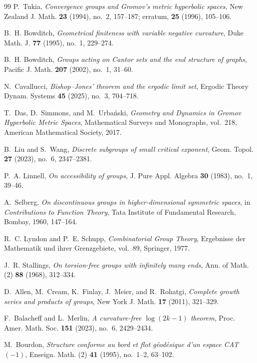 \documentclass[11pt]{article}
\theoremstyle{definition}
\begin{document}
\begin{thebibliography}{99}
P.~Tukia,
\emph{Convergence groups and Gromov's metric hyperbolic spaces},
New Zealand J. Math. \textbf{23} (1994), no.~2, 157--187;
erratum, \textbf{25} (1996), 105--106.

B.~H. Bowditch,
\emph{Geometrical finiteness with variable negative curvature},
Duke Math. J. \textbf{77} (1995), no.~1, 229--274.

B.~H. Bowditch,
\emph{Groups acting on Cantor sets and the end structure of graphs},
Pacific J. Math. \textbf{207} (2002), no.~1, 31--60.

N.~Cavallucci,
\emph{Bishop--Jones' theorem and the ergodic limit set},
Ergodic Theory Dynam. Systems \textbf{45} (2025), no.~3, 704--718.

T.~Das, D.~Simmons, and M.~Urba\'nski,
\emph{Geometry and Dynamics in Gromov Hyperbolic Metric Spaces},
Mathematical Surveys and Monographs, vol.~218, American Mathematical Society, 2017.

B.~Liu and S.~Wang,
\emph{Discrete subgroups of small critical exponent},
Geom. Topol. \textbf{27} (2023), no.~6, 2347--2381.


P.~A. Linnell,
\emph{On accessibility of groups},
J. Pure Appl. Algebra \textbf{30} (1983), no.~1, 39--46.

A.~Selberg,
\emph{On discontinuous groups in higher-dimensional symmetric spaces},
in \emph{Contributions to Function Theory}, Tata Institute of Fundamental Research,
Bombay, 1960, 147--164.

R.~C. Lyndon and P.~E. Schupp,
\emph{Combinatorial Group Theory},
Ergebnisse der Mathematik und ihrer Grenzgebiete, vol.~89, Springer, 1977.

J.~R. Stallings,
\emph{On torsion-free groups with infinitely many ends},
Ann. of Math. (2) \textbf{88} (1968), 312--334.



D.~Allen, M.~Cream, K.~Finlay, J.~Meier, and R.~Rohatgi,
\emph{Complete growth series and products of groups},
New York J. Math. \textbf{17} (2011), 321--329.

F.~Balacheff and L.~Merlin,
\emph{A curvature-free $\log(2k-1)$ theorem},
Proc. Amer. Math. Soc. \textbf{151} (2023), no.~6, 2429--2434.

M.~Bourdon,
\emph{Structure conforme au bord et flot g\'eod\'esique d'un espace CAT$(-1)$},
Enseign. Math. (2) \textbf{41} (1995), no.~1--2, 63--102.


\end{thebibliography}
\end{document}
